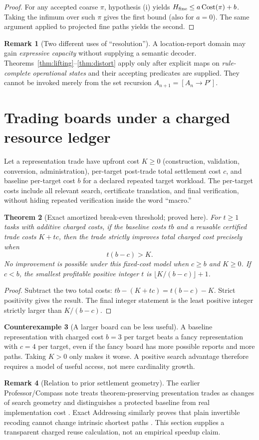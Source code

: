 \documentclass[11pt,letterpaper]{article}
\newtheorem{theorem}{Theorem}[section]
\theoremstyle{definition}
\newtheorem{counterexample}[theorem]{Counterexample}
\newtheorem{remark}[theorem]{Remark}
\newcommand{\Cost}{\operatorname{Cost}}
\begin{document}
\begin{proof}
For any accepted coarse $\pi$, hypothesis (i) yields $H_{\rm fine}\le a\Cost(\pi)+b$. Taking the infimum over such $\pi$ gives the first bound (also for $a=0$). The same argument applied to projected fine paths yields the second.
\end{proof}
\begin{remark}[Two different uses of ``resolution'']
A location-report domain may gain \emph{expressive capacity} without supplying a semantic decoder. Theorems~\ref{thm:lifting}--\ref{thm:distort} apply only after explicit maps on \emph{rule-complete operational states} and their accepting predicates are supplied. They cannot be invoked merely from the set recursion $A_{n+1}=[A_n\to P']$.
\end{remark}

\section{Trading boards under a charged resource ledger}
Let a representation trade have upfront cost $K\ge0$ (construction, validation, conversion, administration), per-target post-trade total settlement cost $c$, and baseline per-target cost $b$ for a declared repeated target workload. The per-target costs include all relevant search, certificate translation, and final verification, without hiding repeated verification inside the word ``macro.''
\begin{theorem}[Exact amortized break-even threshold; proved here]\label{thm:breakeven}
For $t\ge1$ tasks with additive charged costs, if the baseline costs $tb$ and a reusable certified trade costs $K+tc$, then the trade strictly improves total charged cost precisely when
\[
\boxed{t(b-c)>K.}
\]
No improvement is possible under this fixed-cost model when $c\ge b$ and $K\ge0$. If $c<b$, the smallest profitable positive integer $t$ is $\lfloor K/(b-c)\rfloor+1$.
\end{theorem}
\begin{proof}
Subtract the two total costs: $tb-(K+tc)=t(b-c)-K$. Strict positivity gives the result. The final integer statement is the least positive integer strictly larger than $K/(b-c)$.
\end{proof}
\begin{counterexample}[A larger board can be less useful]
A baseline representation with charged cost $b=3$ per target beats a fancy representation with $c=4$ per target, even if the fancy board has more possible reports and more paths. Taking $K>0$ only makes it worse. A positive search advantage therefore requires a model of useful access, not mere cardinality growth.
\end{counterexample}
\begin{remark}[Relation to prior settlement geometry]
The earlier Professor/Compass note treats theorem-preserving presentation trades as changes of search geometry and distinguishes a protected baseline from real implementation cost \cite{partial}. Exact Addressing similarly proves that plain invertible recoding cannot change intrinsic shortest paths \cite{exact}. This section supplies a transparent charged reuse calculation, not an empirical speedup claim.
\end{remark}
\end{document}
